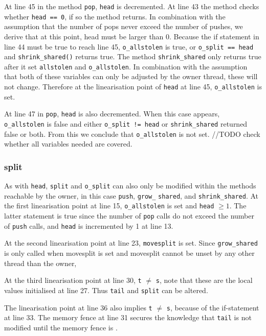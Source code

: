 \documentclass{sig-alternate-br}
\begin{document}
At line 45 in the method \texttt{pop}, \texttt{head} is decremented.
At line 43 the method checks whether \texttt{head == 0}, if so the method returns.
In combination with the assumption that the number of pops never exceed the number of pushes, we derive that at this point, head must be larger than 0.
Because the if statement in line 44 must be true to reach line 45, \texttt{o\_allstolen} is true, or \texttt{o\_split == head} and \texttt{shrink\_shared()} returns true.
The method \texttt{shrink\_shared} only returns true after it set \texttt{allstolen} and \texttt{o\_allstolen}.
In combination with the assumption that both of these variables can only be adjusted by the owner thread, these will not change.
Therefore at the linearisation point of \texttt{head} at line 45, \texttt{o\_allstolen} is set.

At line 47 in \texttt{pop}, \texttt{head} is also decremented.
When this case appears, \texttt{o\_allstolen} is false and either \texttt{o\_split != head} or \texttt{shrink\_shared} returned false or both.
From this we conclude that \texttt{o\_allstolen} is not set.
//TODO check whether all variables needed are covered.

\subsubsection{split}
As with \texttt{head}, \texttt{split} and \texttt{o\_split} can also only be modified within the methods reachable by the owner, in this case \texttt{push}, \texttt{grow\_} \texttt{shared}, and \texttt{shrink\_shared}.
At the first linearisation point at line 15, \texttt{o\_allstolen} is set and \texttt{head} $\geq 1$.
The latter statement is true since the number of \texttt{pop} calls do not exceed the number of \texttt{push} calls, and \texttt{head} is incremented by 1 at line 13.

At the second linearisation point at line 23, \texttt{movesplit} is set.
Since \texttt{grow\_shared} is only called when movesplit is set and movesplit cannot be unset by any other thread than the owner, 

At the third linearisation point at line 30, \texttt{t} $\neq$ \texttt{s}, note that these are the local values initialised at line 27.
Thus \texttt{tail} and \texttt{split} can be altered.

The linearisation point at line 36 also implies \texttt{t} $\neq$ \texttt{s}, because of the if-statement at line 33.
The memory fence at line 31 secures the knowledge that \texttt{tail} is not modified until the memory fence is .
\end{document}
